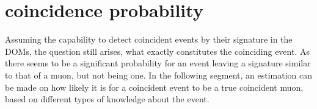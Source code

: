 \section{coincidence probability}

Assuming the capability to detect coincident events by their signature in the DOMs, the question still arises, what exactly constitutes the coinciding event. As 
there seems to be a significant probability for an event leaving a signature similar to that of a muon, but not being one. In the following segment, an estimation
can be made on how likely it is for a coincident event to be a true coincident muon, based on different types of knowledge about the event. 

